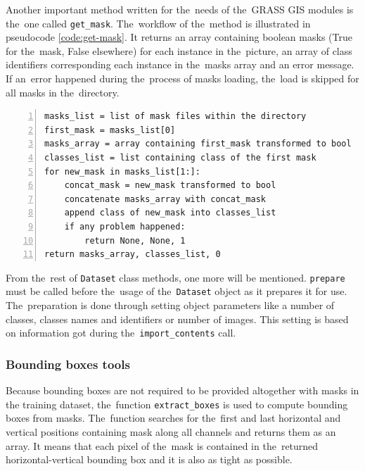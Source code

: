Another important method written for the~needs of the~GRASS GIS modules is
the~one called \verb|get_mask|. The~workflow of the~method is illustrated in 
pseudocode \ref{code:get-mask}. It returns an array containing boolean masks 
(True for the~mask, False elsewhere) for each instance in the~picture, an array 
of class identifiers corresponding each instance in the~masks array and an error 
message. If an~error happened during the~process of masks loading, the~load is 
skipped for all masks in the~directory.

{\scriptsize
\begin{lstlisting}[style=python, caption={get\_mask}, captionpos=b, 
label=code:get-mask, deletekeywords={class},
backgroundcolor = \color{light-gray}, numbers=left, breaklines=true]
masks_list = list of mask files within the directory
first_mask = masks_list[0]
masks_array = array containing first_mask transformed to bool
classes_list = list containing class of the first mask
for new_mask in masks_list[1:]:
    concat_mask = new_mask transformed to bool
    concatenate masks_array with concat_mask
    append class of new_mask into classes_list
    if any problem happened:
        return None, None, 1
return masks_array, classes_list, 0
\end{lstlisting}}

From the~rest of \verb|Dataset| class methods, one more will be mentioned.
\verb|prepare| must be called before the~usage of
the~\verb|Dataset| object as it prepares it for use. The~preparation is done through 
setting object parameters like a number of classes, classes names and identifiers 
or number of images. This setting is based on information got during
the~\verb|import_contents| call.

\subsubsection{Bounding boxes tools}
\label{bbox-funcs}

Because bounding boxes are not required to be provided altogether with masks in 
the training dataset, the~function \verb|extract_boxes| is used to compute 
bounding boxes from masks. The~function searches for the~first and last 
horizontal and vertical positions containing mask along all channels and returns 
them as an array. It means that each pixel of the~mask is contained in
the~returned horizontal-vertical bounding box and it is also as tight as possible.

